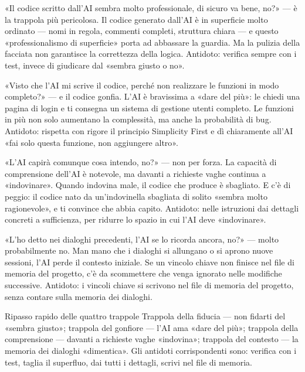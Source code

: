 
«Il codice scritto dall'AI sembra molto professionale, di sicuro va bene, no?» — è la trappola più pericolosa. Il codice generato dall'AI è in superficie molto ordinato — nomi in regola, commenti completi, struttura chiara — e questo «professionalismo di superficie» porta ad abbassare la guardia. Ma la pulizia della facciata non garantisce la correttezza della logica. Antidoto: verifica sempre con i test, invece di giudicare dal «sembra giusto o no».


«Visto che l'AI mi scrive il codice, perché non realizzare le funzioni in modo completo?» — e il codice gonfia. L'AI è bravissima a «dare del più»: le chiedi una pagina di login e ti consegna un sistema di gestione utenti completo. Le funzioni in più non solo aumentano la complessità, ma anche la probabilità di bug. Antidoto: rispetta con rigore il principio Simplicity First e dì chiaramente all'AI «fai solo questa funzione, non aggiungere altro».


«L'AI capirà comunque cosa intendo, no?» — non per forza. La capacità di comprensione dell'AI è notevole, ma davanti a richieste vaghe continua a «indovinare». Quando indovina male, il codice che produce è sbagliato. E c'è di peggio: il codice nato da un'indovinella sbagliata di solito «sembra molto ragionevole», e ti convince che abbia capito. Antidoto: nelle istruzioni dai dettagli concreti a sufficienza, per ridurre lo spazio in cui l'AI deve «indovinare».


«L'ho detto nei dialoghi precedenti, l'AI se lo ricorda ancora, no?» — molto probabilmente no. Man mano che i dialoghi si allungano o si aprono nuove sessioni, l'AI perde il contesto iniziale. Se un vincolo chiave non finisce nel file di memoria del progetto, c'è da scommettere che venga ignorato nelle modifiche successive. Antidoto: i vincoli chiave si scrivono nel file di memoria del progetto, senza contare sulla memoria dei dialoghi.

\begin{tcbwarn}{Ripasso rapido delle quattro trappole}
Trappola della fiducia — non fidarti del «sembra giusto»; trappola del gonfiore — l'AI ama «dare del più»; trappola della comprensione — davanti a richieste vaghe «indovina»; trappola del contesto — la memoria dei dialoghi «dimentica». Gli antidoti corrispondenti sono: verifica con i test, taglia il superfluo, dai tutti i dettagli, scrivi nel file di memoria.

\end{tcbwarn}

